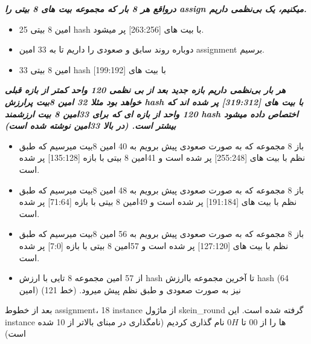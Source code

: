 \textit{\textbf{درواقع هر 8 بار که مجموعه بیت های 8 بیتی را assign میکنیم، یک بی‌نظمی داریم.
}}
\begin{itemize}
	\item
	      25 امین 8 بیتی hash با بیت های [263:256] پر میشود.
	\item
	      دوباره روند سابق و صعودی را داریم تا به 33 امین assignment برسیم.
	\item
	      33 امین 8 بیتی hash با بیت های [199:192]
	      
\end{itemize}

\textit{\textbf{هر بار بی‌نظمی داریم بازه جدید بعد از بی نظمی 120 واحد کمتر از بازه قبلی خواهد بود مثلا 32 امین 8بیت پرارزش hash با بیت های [319:312] پر شده اند که 120 واحد از بازه ای که برای 33امین 8 بیت ارزشمند hash اختصاص داده میشود بیشتر است. (در بالا 33امین نوشته شده است)}}

\begin{itemize}
	\item
	      باز 8 مجموعه که به صورت صعودی پیش برویم به 40 امین 8بیت میرسیم که طبق نظم با بیت های [255:248] پر شده است و 41امین 8 بیتی با بازه [135:128] پر شده است.
	\item
	      باز 8 مجموعه که به صورت صعودی پیش برویم به 48 امین 8بیت میرسیم که طبق نظم با بیت های [191:184] پر شده است و 49امین 8 بیتی با بازه [71:64] پر شده است.
	\item
	      باز 8 مجموعه که به صورت صعودی پیش برویم به 56 امین 8بیت میرسیم که طبق نظم با بیت های [127:120] پر شده است و 57امین 8 بیتی با بازه [7:0] پر شده است.
	\item
	      از 57 امین مجموعه 8 تایی با ارزش hash تا آخرین مجموعه باارزش hash (64 امین) نیز به صورت صعودی و طبق نظم پیش میرود. (خط 121)
	      
\end{itemize}

بعد از خطوط assignment، 18 instance از ماژول skein\_round گرفته شده است.
این instance ها را از 
$00$
تا
$0H$
نام گذاری کردیم (نامگذاری در مبنای بالاتر از 10 شده است)

